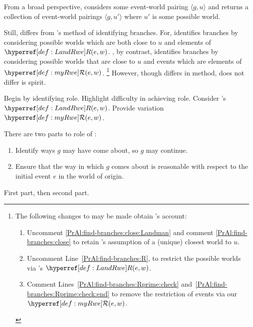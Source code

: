 \begin{note}
  From a broad perspective, \AlgFindBranches{} considers some event-world pairing \(\langle g,u \rangle\) and returns a collection of event-world pairings \(\langle g,u' \rangle\) where \(u'\) is some possible world.

  Still, \AlgFindBranches{} differs from \citeauthor{Landman:1992wh}'s method of identifying branches.
  For, \citeauthor{Landman:1992wh} identifies branches by considering possible worlds which are both close to \(u\) and elements of \(\lRwe{w}{e}\).
  \AlgFindBranches{}, by contrast, identifies branches by considering possible worlds that are close to \(u\) and events which are elements of \(\mRwe{w}{e}\).%
  \footnote{
    \label{fn:Alg:branches:getLandman}
    The following changes to \AlgFindBranches{} may be made obtain \citeauthor{Landman:1992wh}'s account:
    \begin{enumerate}[label=\arabic*., ref=(\arabic*), noitemsep]
    \item
      Uncomment \autoref{PrAl:find-branches:close:Landman} and comment \autoref{PrAl:find-branches:close} to retain \citeauthor{Landman:1992wh}'s assumption of a (unique) closest world to \(u\).
    \item
      Uncomment Line~\ref{PrAl:find-branches:R}, to restrict the possible worlds via \citeauthor{Landman:1992wh}'s \(\lRwe{w}{e}\).
    \item
      Comment Lines~\ref{PrAl:find-branches:Rprime:check} and~\ref{PrAl:find-branches:Rprime:check:end} to remove the restriction of events via our \(\mRwe{w}{e}\).
    \end{enumerate}
  }
  However, though \AlgFindBranches{} differs in method, \AlgFindBranches{} does not differ is spirit.

  Begin by identifying role.
  Highlight difficulty in achieving role.
  Consider \citeauthor{Landman:1992wh}'s \(\lRwe{w}{e}\).
  Provide variation \(\mRwe{w}{e}\).
\end{note}


\begin{note}
  There are two parts to role of \AlgFindBranches{}:
  \begin{enumerate}[label=\alph*., ref=(\alph*), noitemsep]
  \item
    Identify ways \(g\) may have come about, so \(g\) may continue.
  \item
    Ensure that the way in which \(g\) comes about is reasonable with respect to the initial event \(e\) in the world of origin.
  \end{enumerate}

  First part, then second part.
\end{note}

